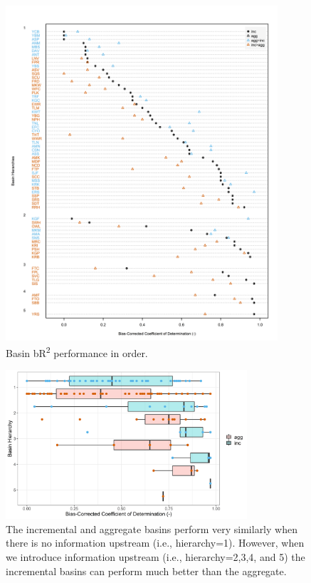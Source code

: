 \begin{figure}
  	\centering
 	 \includegraphics[width=0.9\textwidth, trim={0 0 0 0}, clip=true]{plots/rplot211_bR2dotchart_comp.png}
  	\caption{Basin bR\textsuperscript{2} performance in order.}
  	\label{fig:br2dotchartcomp}
\end{figure}

\begin{figure}
  	\centering
 	\includegraphics[width=0.8\textwidth, trim={0 0 0 0}, clip=true]{plots/rplot212_bR2gofboxplot_comp.png}
	\caption{The incremental and aggregate basins perform very similarly when there is no information upstream (i.e., hierarchy=1). However, when we introduce information upstream (i.e., hierarchy=2,3,4, and 5) the incremental basins can perform much better than the aggregate.}
	\label{fig:br2boxplotcomp}
\end{figure}


